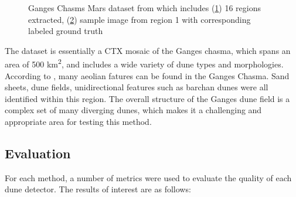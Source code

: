 \begin{figure}
	\centering
	\begin{subfigure}{\textwidth}
		\centering
		\caption{}
		\label{fig:ganges_regions}
	\end{subfigure}
	\begin{subfigure}{\textwidth}
		\centering
		\caption{}
		\label{fig:ganges1_image}
	\end{subfigure}
	\caption{Ganges Chasms Mars dataset from \cite{vaz_object_based_dune_analysis} which includes (\ref{fig:ganges_regions}) 16 regions extracted, (\ref{fig:ganges1_image}) sample image from region 1 with corresponding labeled ground truth}
	\label{fig:mars_ganges_dataset}
\end{figure}


The dataset is essentially a CTX mosaic of the Ganges chasma, which spans an area of 500 km\textsuperscript{2}, and includes a wide variety of dune types and morphologies. According to \cite{fenton_aeolian_sediment_ganges_chasma_mars}, many aeolian fatures can be found in the Ganges Chasma. Sand sheets, dune fields, unidirectional features such as barchan dunes were all identified within this region. The overall structure of the Ganges dune field is a complex set of many diverging dunes, which makes it a challenging and appropriate area for testing this method. 


\subsection{Evaluation}\label{subsec:evaluation}

For each method, a number of metrics were used to evaluate the quality of each dune detector. The results of interest are as follows:

